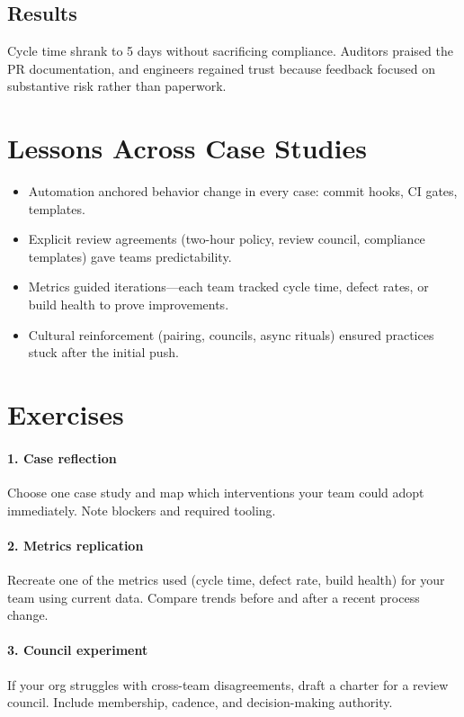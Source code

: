 \subsection{Results}
Cycle time shrank to 5 days without sacrificing compliance. Auditors praised the PR documentation, and engineers regained trust because feedback focused on substantive risk rather than paperwork.

\section{Lessons Across Case Studies}
\begin{itemize}
  \item Automation anchored behavior change in every case: commit hooks, CI gates, templates.
  \item Explicit review agreements (two-hour policy, review council, compliance templates) gave teams predictability.
  \item Metrics guided iterations---each team tracked cycle time, defect rates, or build health to prove improvements.
  \item Cultural reinforcement (pairing, councils, async rituals) ensured practices stuck after the initial push.
\end{itemize}

\section*{Exercises}

\paragraph{1. Case reflection} Choose one case study and map which interventions your team could adopt immediately. Note blockers and required tooling.

\paragraph{2. Metrics replication} Recreate one of the metrics used (cycle time, defect rate, build health) for your team using current data. Compare trends before and after a recent process change.

\paragraph{3. Council experiment} If your org struggles with cross-team disagreements, draft a charter for a review council. Include membership, cadence, and decision-making authority.

